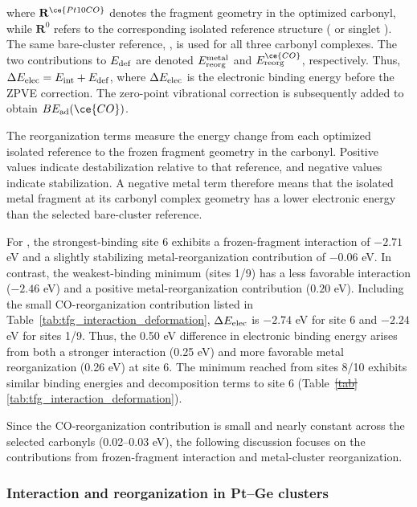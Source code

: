 where $\mathbf R^{\ce{Pt10CO}}$ denotes the fragment geometry in the optimized carbonyl, while $\mathbf R^0$ refers to the corresponding isolated reference structure ( or singlet ). {The same bare-cluster reference, , is used for all three carbonyl complexes.} The two contributions to $E_{\rm def}$ are denoted $E_{\rm reorg}^{\rm metal}$      and $E_{\rm reorg}^{\ce{CO}}$, respectively. Thus, $\Delta E_{\rm elec}=E_{\rm int}+E_{\rm def}$, where $\Delta E_{\rm elec}$ is the electronic binding energy before the ZPVE correction. The zero-point vibrational correction is subsequently added to obtain $BE_{\rm ad}(\ce{CO})$.

{The reorganization terms measure the energy change from each optimized isolated reference to the frozen fragment geometry in the carbonyl. Positive values indicate destabilization relative to that reference, and negative values indicate stabilization. A negative metal term therefore means that the isolated metal fragment at its carbonyl complex geometry has a lower electronic energy than the selected bare-cluster reference.}

For , the strongest-binding site 6 exhibits a frozen-fragment interaction of $-2.71$ eV and a slightly stabilizing metal-reorganization contribution of $-0.06$ eV. In contrast, the weakest-binding minimum (sites 1/9) has a less favorable interaction ($-2.46$ eV) and a positive metal-reorganization contribution ($0.20$ eV). {Including the small CO-reorganization contribution listed in Table~\ref{tab:tfg_interaction_deformation}, $\Delta E_{\rm elec}$ is $-2.74$ eV for site 6 and $-2.24$ eV for sites 1/9.} Thus, the 0.50 eV difference in electronic binding energy arises from both a stronger interaction (0.25 eV) and more favorable metal reorganization (0.26 eV) at site 6. The minimum reached from sites 8/10 exhibits similar binding energies and decomposition terms to site 6 (Table~\sout{\ref{tab}}\textcolor{purple}{\ref{tab:tfg_interaction_deformation}}).

Since the CO-reorganization contribution is small and nearly constant across the
selected carbonyls (0.02–0.03 eV), the following discussion focuses on the 
contributions
from frozen-fragment interaction and metal-cluster reorganization.

\subsubsection{Interaction and reorganization in Pt--Ge clusters}

